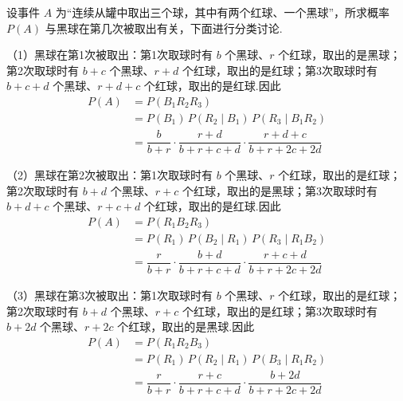 \begin{solution}
    设事件 $A$ 为“连续从罐中取出三个球，其中有两个红球、一个黑球”，所求概率 $P(A)$ 与黑球在第几次被取出有关，下面进行分类讨论.

    （1）黑球在第1次被取出：第1次取球时有 $b$ 个黑球、$r$ 个红球，取出的是黑球；第2次取球时有 $b+c$ 个黑球、$r+d$ 个红球，取出的是红球；第3次取球时有 $b+c+d$ 个黑球、$r+d+c$ 个红球，取出的是红球.因此
    $$
    \begin{aligned}
        P(A) &= P(B_1 R_2 R_3) \\
        &= P(B_1) \, P(R_2 \mid B_1) \, P(R_3 \mid B_1 R_2) \\
        &= \dfrac{b}{b+r} \cdot \dfrac{r+d}{b+r+c+d} \cdot \dfrac{r+d+c}{b+r+2c+2d}
    \end{aligned}
    $$

    （2）黑球在第2次被取出：第1次取球时有 $b$ 个黑球、$r$ 个红球，取出的是红球；第2次取球时有 $b+d$ 个黑球、$r+c$ 个红球，取出的是黑球；第3次取球时有 $b+d+c$ 个黑球、$r+c+d$ 个红球，取出的是红球.因此
    $$
    \begin{aligned}
        P(A) &= P(R_1 B_2 R_3) \\
        &= P(R_1) \, P(B_2 \mid R_1) \, P(R_3 \mid R_1 B_2) \\
        &= \dfrac{r}{b+r} \cdot \dfrac{b+d}{b+r+c+d} \cdot \dfrac{r+c+d}{b+r+2c+2d}
    \end{aligned}
    $$

    （3）黑球在第3次被取出：第1次取球时有 $b$ 个黑球、$r$ 个红球，取出的是红球；第2次取球时有 $b+d$ 个黑球、$r+c$ 个红球，取出的是红球；第3次取球时有 $b+2d$ 个黑球、$r+2c$ 个红球，取出的是黑球.因此
    $$
    \begin{aligned}
        P(A) &= P(R_1 R_2 B_3) \\
        &= P(R_1) \, P(R_2 \mid R_1) \, P(B_3 \mid R_1 R_2) \\
        &= \dfrac{r}{b+r} \cdot \dfrac{r+c}{b+r+c+d} \cdot \dfrac{b+2d}{b+r+2c+2d}
    \end{aligned}
    $$
\end{solution}

